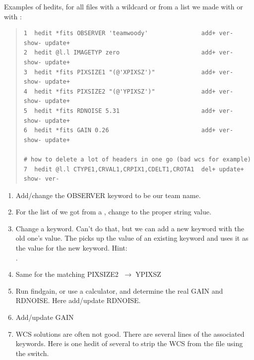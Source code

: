 \documentclass[letter,11pt,oneside]{article}
\newcommand{\menu}{\ensuremath{\;\rightarrow\;}}
\begin{document}
Examples of hedits, for all files with a wildcard {\color{verbcolor}{\verb#*fits#}}
or from a list we made with {\color{verbcolor}{\verb#files#}} or with
{\color{verbcolor}{\verb#hselect#}}:

\begin{quote}
\begingroup \fontsize{8pt}{8pt}
\selectfont
\begin{verbatim}
1  hedit *fits OBSERVER 'teamwoody'               add+ ver- show- update+
2  hedit @l.l IMAGETYP zero                       add+ ver- show- update+
3  hedit *fits PIXSIZE1 "(@'XPIXSZ')"             add+ ver- show- update+
4  hedit *fits PIXSIZE2 "(@'YPIXSZ')"             add+ ver- show- update+
5  hedit *fits RDNOISE 5.31                       add+ ver- show- update+
6  hedit *fits GAIN 0.26                          add+ ver- show- update+

# how to delete a lot of headers in one go (bad wcs for example)
7  hedit @l.l CTYPE1,CRVAL1,CRPIX1,CDELT1,CROTA1  del+ update+ show- ver-
\end{verbatim}
\endgroup
\end{quote}

\vspace{-.15cm}
\begin{enumerate}[resume]\addtolength{\itemsep}{-0.5\baselineskip}
   \item   Add/change the OBSERVER keyword to be our team name.
   \item   For the list of {\color{verbcolor}{\verb#IMAGETYP ?= 'Bias'#}} we
got from a {\color{verbcolor}{\verb#hselect#}}, change to the proper
{\color{verbcolor}{\verb#zero#}} string value.
   \item Change a keyword. Can't do that, but we can add a new keyword
     with the old one's value. The
     {\color{verbcolor}{\verb#"(@'XPIXSZ')"#}} picks up the value of
     an existing {\color{verbcolor}{\verb#XPIXSZ#}} keyword and uses
     it as the value for the new keyword. Hint:\\
     {\color{verbcolor}{\verb#hedit @l.l XPIXSIZ del+ update+ show- ver-#}}.
   \item   Same for the matching PIXSIZE2 \menu YPIXSZ
   \item Run findgain, or use a calculator, and determine the real
     GAIN and RDNOISE. Here add/update RDNOISE.
   \item   Add/update GAIN
   \item WCS solutions are often not good. There are several lines of
     the associated keywords. Here is one hedit of several to strip
     the WCS from the file using the
     {\color{verbcolor}{\verb#delete#}} switch.
\end{enumerate}
\end{document}
